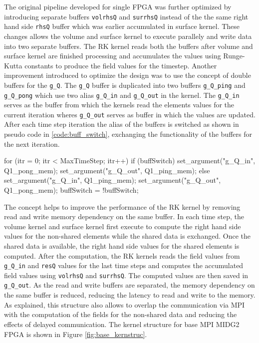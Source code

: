 The original pipeline developed for single FPGA was further optimized by introducing separate buffers
\texttt{volrhsQ} and \texttt{surrhsQ} instead of the the same right hand side \texttt{rhsQ} buffer
which was earlier accumulated in surface kernel. These changes allows the volume and surface kernel
to execute parallely and write data into two separate buffers. The RK kernel reads both the buffers
after volume and surface kernel are finished processing and accumulates the values using Runge-Kutta
constants to produce the field values for the timestep. Another improvement introduced to optimize the
design was to use the concept of double buffers for the \texttt{g\_Q}. The \texttt{g\_Q} buffer is
duplicated into two buffers \texttt{g\_Q\_ping} and \texttt{g\_Q\_pong} which use two alias \texttt{g\_Q\_in}
and \texttt{g\_Q\_out} in the kernel. The \texttt{g\_Q\_in} serves as the buffer from which the kernels read
the elements values for the current iteration wheres \texttt{g\_Q\_out} serves as buffer in which the values
are updated. After each time step iteration the alias of the buffers is switched as shown
in pseudo code in \ref{code:buff_switch}, exchanging the functionality of the buffers for the next iteration.

\begin{CppCode}[caption=Buffer switching for double buffers in each iteration, frame=tlrb, label=code:buff_switch]
for (itr = 0; itr < MaxTimeStep; itr++)
{
    if (buffSwitch)
    {
        set_argument("g_Q_in", Q1_pong_mem);
        set_argument("g_Q_out", Q1_ping_mem);
    }
    else
    {
        set_argument("g_Q_in", Q1_ping_mem);
        set_argument("g_Q_out", Q1_pong_mem);
    }
    buffSwitch = !buffSwitch;
}
\end{CppCode}

The concept helps to improve the performance of the RK kernel
by removing read and write memory dependency on the same buffer. In each time step,
the volume kernel and surface kernel first execute to compute the right hand side values for the
non-shared elements while the shared data is exchanged. Once the shared data is available,
the right hand side values for the shared elements is computed. After the computation,
the RK kernels reads the field values from \texttt{g\_Q\_in} and \texttt{resQ} values
for the last time steps and computes the accumulated field values using
\texttt{volrhsQ} and \texttt{surrhsQ}. The computed values are then saved in \texttt{g\_Q\_out}.
As the read and write buffers are separated, the memory dependency on the same buffer is reduced,
reducing the latency to read and write to the memory. As explained, this structure also allows
to overlap the communication via MPI with the computation of the fields for the non-shared data
and reducing the effects of delayed communication. The kernel structure for base MPI MIDG2 FPGA
is shown in Figure \ref{fig:base_kernstruc}.

